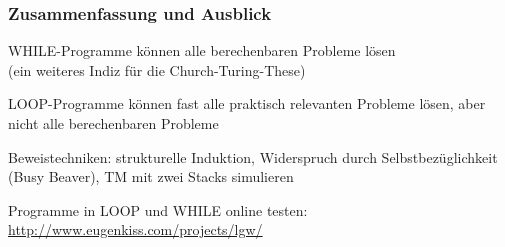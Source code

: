 \documentclass[aspectratio=1610,onlymath]{beamer}
\begin{document}
\begin{frame}\frametitle{Zusammenfassung und Ausblick}

WHILE-Programme können alle berechenbaren Probleme lösen\\
(ein weiteres Indiz für die Church-Turing-These)
\bigskip

LOOP-Programme können fast alle praktisch relevanten Probleme lösen,
aber nicht alle berechenbaren Probleme
\bigskip

Beweistechniken: strukturelle Induktion, Widerspruch durch Selbstbezüglichkeit (Busy Beaver), TM mit zwei Stacks simulieren\bigskip

Programme in LOOP und WHILE online testen:\\
\url{http://www.eugenkiss.com/projects/lgw/}\bigskip


\end{frame}

% 
% 
\end{document}
